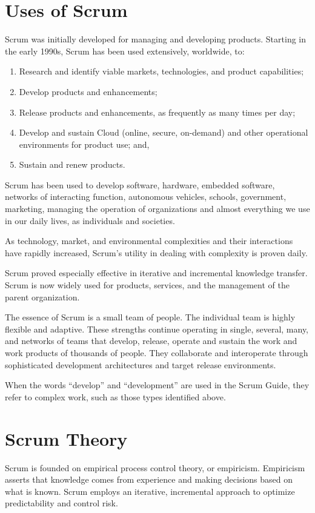 \section{Uses of Scrum}
Scrum was initially developed for managing and developing products. Starting in the early
1990s, Scrum has been used extensively, worldwide, to:
\begin{enumerate}
\item Research and identify viable markets, technologies, and product capabilities;
\item Develop products and enhancements;
\item Release products and enhancements, as frequently as many times per day;
\item Develop and sustain Cloud (online, secure, on-demand) and other operational environments for 
      product use; and,
\item Sustain and renew products.
\end{enumerate}
Scrum has been used to develop software, hardware, embedded software, networks of
interacting function, autonomous vehicles, schools, government, marketing, managing the
operation of organizations and almost everything we use in our daily lives, as individuals and
societies.

As technology, market, and environmental complexities and their interactions have rapidly
increased, Scrum's utility in dealing with complexity is proven daily.

Scrum proved especially effective in iterative and incremental knowledge transfer. Scrum is now
widely used for products, services, and the management of the parent organization.

The essence of Scrum is a small team of people. The individual team is highly flexible and
adaptive. These strengths continue operating in single, several, many, and networks of teams
that develop, release, operate and sustain the work and work products of thousands of people.
They collaborate and interoperate through sophisticated development architectures and target
release environments.

When the words ``develop'' and ``development'' are used in the Scrum Guide, they refer to
complex work, such as those types identified above.

\section{Scrum Theory}
Scrum is founded on empirical process control theory, or empiricism. Empiricism asserts that
knowledge comes from experience and making decisions based on what is known. Scrum
employs an iterative, incremental approach to optimize predictability and control risk.

